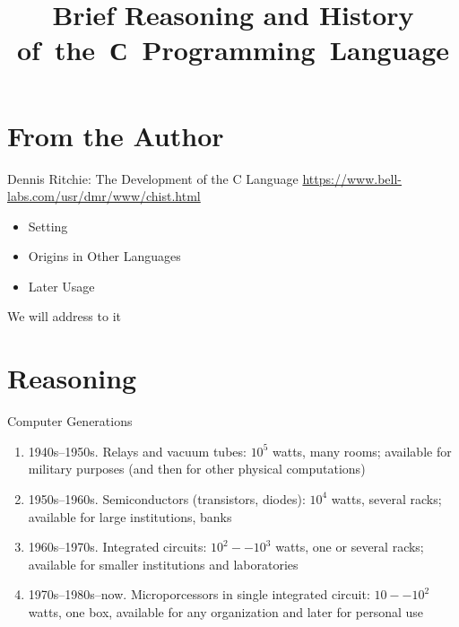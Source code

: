 \documentclass[xetex,aspectratio=149]{beamer}
\title{Brief Reasoning and History of~the~С~Programming~Language}
\begin{document}
\hello

\section{From the Author}

\begin{frame}{Dennis Ritchie: The Development of the C Language}
	\url{https://www.bell-labs.com/usr/dmr/www/chist.html}
	\begin{itemize}
		\item Setting
		\item Origins in Other Languages
		\item Later Usage
	\end{itemize}
	We will address to it
\end{frame}

\section{Reasoning}

\begin{frame}{Computer Generations}
	\begin{enumerate}
		\item 1940s--1950s. Relays and vacuum tubes: $10^5$ watts, many rooms; available for military purposes (and then for other physical computations)
		\item 1950s--1960s. Semiconductors (transistors, diodes): $10^4$ watts, several racks; available for large institutions, banks
		\item 1960s--1970s. Integrated circuits: $10^2 -- 10^3$ watts, one or several racks; available for smaller institutions and laboratories
		\item 1970s--1980s--now. Microporcessors in single integrated circuit: $10 -- 10^2$ watts,
		one box, available for any organization and later for personal use
	\end{enumerate}
\end{frame}
\end{document}
